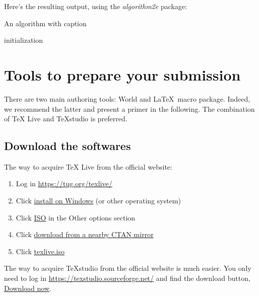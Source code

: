 \documentclass[12pt]{article}  %
\begin{document}
 Here's the resulting output, using the \textit{algorithm2e} package:
 
 \begin{algorithm}
     \caption{An algorithm with caption}\label{alg1}
     initialization\;
 \end{algorithm}
 
 
 
 
 \section{Tools to prepare your submission}
 
 There are two main authoring tools: World and \LaTeX ~macro package. Indeed, we recommend the latter and present a primer in the following. The combination of TeX Live and TeXstudio is preferred. 
 
 \subsection{Download the softwares}
 
 
 
 The way to acquire TeX Live from the official website: 
 \begin{enumerate}[Step 1:]
     \item Log in \href{https://tug.org/texlive/}{\underline{https://tug.org/texlive/}}
     \item Click \href{https://tug.org/texlive/windows.html}{\underline{install on Windows}} (or other operating system)
     \item Click \href{https://tug.org/texlive/acquire-iso.html}{\underline{ISO}} in the Other options section
     \item Click \href{https://mirror.ctan.org/systems/texlive/Images/}{\underline{download from a nearby CTAN mirror}}
     \item Click \href{https://mirror.cloud.tencent.com/CTAN/systems/texlive/Images/texlive.iso}{\underline{texlive.iso}}
 \end{enumerate}
 
 The way to acquire TeXstudio from the official website is much easier. You only need to log in \href{https://texstudio.sourceforge.net/}{\underline{https://texstudio.sourceforge.net/}} and find the download button, \href{https://github.com/texstudio-org/texstudio/releases/download/4.7.2/texstudio-4.7.2-win-qt6.exe}{\underline{Download now}}.
 
\end{document}
